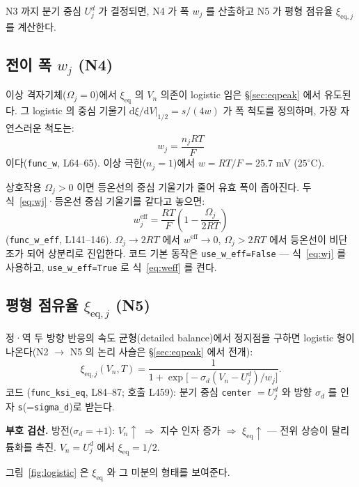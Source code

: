 \documentclass[11pt,a4paper]{article}
\newcommand{\dd}{\mathrm{d}}
\newcommand{\eff}{\mathrm{eff}}
\newcommand{\eq}{\mathrm{eq}}
\begin{document}
N3 까지 분기 중심 $U_j^d$ 가 결정되면, N4 가 폭 $w_j$ 를 산출하고 N5 가
평형 점유율 $\xi_{\eq,j}$ 를 계산한다.

\subsection{전이 폭 $w_j$ (N4)}

이상 격자기체($\Omega_j=0$)에서 $\xi_{\eq}$ 의 $V_n$ 의존이 logistic 임은 \S\ref{sec:eqpeak}
에서 유도된다. 그 logistic 의 중심 기울기 $\dd\xi/\dd V|_{1/2} = s/(4w)$ 가 폭 척도를
정의하며, 가장 자연스러운 척도는:
\begin{equation}
w_j = \frac{n_j RT}{F}
\label{eq:wj}
\end{equation}
이다(\texttt{func\_w}, L64--65). 이상 극한($n_j=1$)에서 $w=RT/F=25.7$ mV ($25^\circ$C).

상호작용 $\Omega_j>0$ 이면 등온선의 중심 기울기가 줄어 유효 폭이 좁아진다.
두 식~\eqref{eq:wj}·등온선 중심 기울기를 같다고 놓으면:
\begin{equation}
w_j^\eff = \frac{RT}{F}\!\left(1 - \frac{\Omega_j}{2RT}\right)
\label{eq:weff}
\end{equation}
(\texttt{func\_w\_eff}, L141--146). $\Omega_j\to2RT$ 에서 $w^\eff\to0$, $\Omega_j>2RT$
에서 등온선이 비단조가 되어 상분리로 진입한다. 코드 기본 동작은 \texttt{use\_w\_eff=False}
— 식~\eqref{eq:wj} 를 사용하고, \texttt{use\_w\_eff=True} 로 식~\eqref{eq:weff} 를 켠다.

\subsection{평형 점유율 $\xi_{\eq,j}$ (N5)}

정·역 두 방향 반응의 속도 균형(detailed balance)에서 정지점을 구하면 logistic 형이
나온다(N2 $\to$ N5 의 논리 사슬은 \S\ref{sec:eqpeak} 에서 전개):
\begin{equation}
\boxed{\xi_{\eq,j}(V_n,T) = \frac{1}{1+\exp\!\bigl[-\sigma_d(V_n - U_j^d)/w_j\bigr]}.}
\label{eq:ksi}
\end{equation}
코드 (\texttt{func\_ksi\_eq}, L84--87; 호출 L459):
분기 중심 \texttt{center} $= U_j^d$ 와 방향 $\sigma_d$ 를 인자 \texttt{s}(=\texttt{sigma\_d})로 받는다.

\textbf{부호 검산.} 방전($\sigma_d=+1$): $V_n\uparrow$ $\Rightarrow$ 지수 인자 증가 $\Rightarrow$
$\xi_{\eq}\uparrow$ — 전위 상승이 탈리튬화를 촉진. $V_n = U_j^d$ 에서 $\xi_{\eq}=1/2$.

그림~\ref{fig:logistic} 은 $\xi_{\eq}$ 와 그 미분의 형태를 보여준다.
\end{document}
